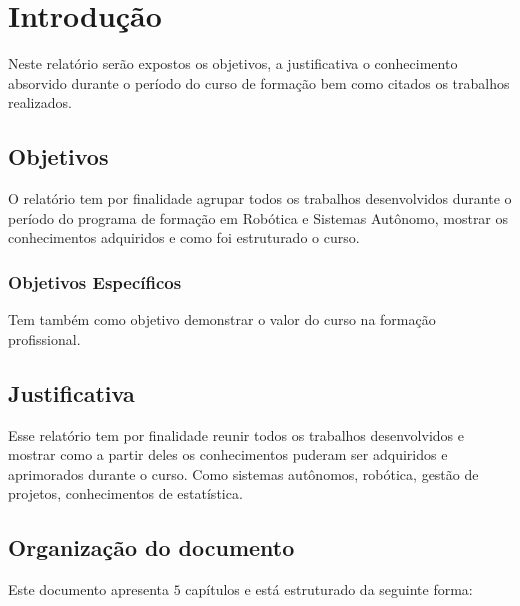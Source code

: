 \chapter{Introdução}
\label{chap:intro}

Neste relatório serão expostos os objetivos, a justificativa  o conhecimento absorvido durante o período do curso de formação bem como citados os trabalhos realizados.

\section{Objetivos}
\label{sec:obj}

O relatório tem por finalidade agrupar todos os trabalhos desenvolvidos durante o período do programa de formação em Robótica e Sistemas Autônomo, mostrar os conhecimentos adquiridos e como foi estruturado o curso.


\subsection{Objetivos Específicos}
\label{ssec:objesp}

Tem também como objetivo demonstrar o valor do curso na formação profissional.



\section{Justificativa}
\label{sec:justi}

Esse relatório tem por finalidade reunir todos os trabalhos desenvolvidos e mostrar como a partir deles os conhecimentos puderam ser adquiridos e aprimorados durante o curso. 
Como sistemas autônomos, robótica, gestão de projetos, conhecimentos de estatística.  





\section{Organização do documento}
\label{section:organizacao}

Este documento apresenta $5$ capítulos e está estruturado da seguinte forma:

